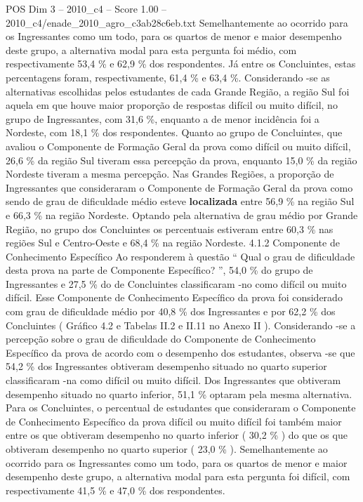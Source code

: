 \begin{textsample}{POS Dim 3 – 2010\_c4 – Score 1.00 – 2010\_c4/enade\_2010\_agro\_c3ab28c6eb.txt}
Semelhantemente ao ocorrido para os Ingressantes como um todo, para os quartos de menor e maior desempenho deste grupo, a alternativa modal para esta pergunta foi médio, com respectivamente 53,4 \% e 62,9 \% dos respondentes.
Já entre os Concluintes, estas percentagens foram, respectivamente, 61,4 \% e 63,4 \%.
Considerando -se as alternativas escolhidas pelos estudantes de cada Grande Região, a região Sul foi aquela em que houve maior proporção de respostas difícil ou muito difícil, no grupo de Ingressantes, com 31,6 \%, enquanto a de menor incidência foi a Nordeste, com 18,1 \% dos respondentes.
Quanto ao grupo de Concluintes, que avaliou o Componente de Formação Geral da prova como difícil ou muito difícil, 26,6 \% da região Sul tiveram essa percepção da prova, enquanto 15,0 \% da região Nordeste tiveram a mesma percepção.
Nas Grandes Regiões, a proporção de Ingressantes que consideraram o Componente de Formação Geral da prova como sendo de grau de dificuldade médio esteve \textbf{localizada} entre 56,9 \% na região Sul e 66,3 \% na região Nordeste.
Optando pela alternativa de grau médio por Grande Região, no grupo dos Concluintes os percentuais estiveram entre 60,3 \% nas regiões Sul e Centro-Oeste e 68,4 \% na região Nordeste. 4.1.2 Componente de Conhecimento Específico Ao responderem à questão “ Qual o grau de dificuldade desta prova na parte de Componente Específico? ”, 54,0 \% do grupo de Ingressantes e 27,5 \% do de Concluintes classificaram -no como difícil ou muito difícil.
Esse Componente de Conhecimento Específico da prova foi considerado com grau de dificuldade médio por 40,8 \% dos Ingressantes e por 62,2 \% dos Concluintes ( Gráfico 4.2 e Tabelas II.2 e II.11 no Anexo II ).
Considerando -se a percepção sobre o grau de dificuldade do Componente de Conhecimento Específico da prova de acordo com o desempenho dos estudantes, observa -se que 54,2 \% dos Ingressantes obtiveram desempenho situado no quarto superior classificaram -na como difícil ou muito difícil.
Dos Ingressantes que obtiveram desempenho situado no quarto inferior, 51,1 \% optaram pela mesma alternativa.
Para os Concluintes, o percentual de estudantes que consideraram o Componente de Conhecimento Específico da prova difícil ou muito difícil foi também maior entre os que obtiveram desempenho no quarto inferior ( 30,2 \% ) do que os que obtiveram desempenho no quarto superior ( 23,0 \% ).
Semelhantemente ao ocorrido para os Ingressantes como um todo, para os quartos de menor e maior desempenho deste grupo, a alternativa modal para esta pergunta foi difícil, com respectivamente 41,5 \% e 47,0 \% dos respondentes.

\end{textsample}
